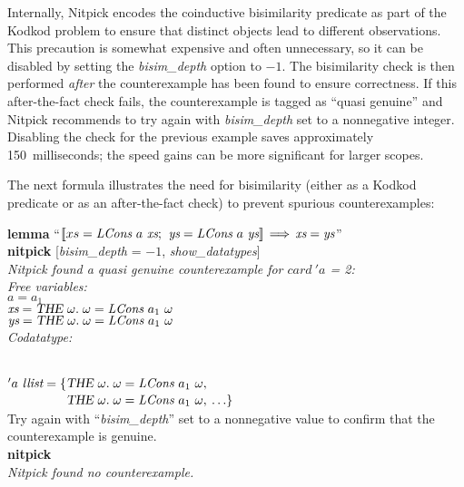 \documentclass[a4paper,12pt]{article}
\def\unr{\ldots}
\begin{document}
Internally, Nitpick encodes the coinductive bisimilarity predicate as part of
the Kodkod problem to ensure that distinct objects lead to different
observations. This precaution is somewhat expensive and often unnecessary, so it
can be disabled by setting the \textit{bisim\_depth} option to $-1$. The
bisimilarity check is then performed \textsl{after} the counterexample has been
found to ensure correctness. If this after-the-fact check fails, the
counterexample is tagged as ``quasi genuine'' and Nitpick recommends to try
again with \textit{bisim\_depth} set to a nonnegative integer. Disabling the
check for the previous example saves approximately 150~milli\-seconds; the speed
gains can be more significant for larger scopes.

The next formula illustrates the need for bisimilarity (either as a Kodkod
predicate or as an after-the-fact check) to prevent spurious counterexamples:

\prew
\textbf{lemma} ``$\mathopen{[\![} xs = \textit{LCons}~a~\textit{xs};\>\, \textit{ys} = \textit{LCons}~a~\textit{ys}\mathclose{]\!]}
\,\Longrightarrow\, \textit{xs} = \textit{ys}$'' \\
\textbf{nitpick} [\textit{bisim\_depth} = $-1$, \textit{show\_datatypes}] \\[2\smallskipamount]
\slshape Nitpick found a quasi genuine counterexample for $\textit{card}~'a$ = 2: \\[2\smallskipamount]
\hbox{}\qquad Free variables: \nopagebreak \\
\hbox{}\qquad\qquad $a = a_1$ \\
\hbox{}\qquad\qquad $\textit{xs} = \textsl{THE}~\omega.\; \omega =
\textit{LCons}~a_1~\omega$ \\
\hbox{}\qquad\qquad $\textit{ys} = \textsl{THE}~\omega.\; \omega = \textit{LCons}~a_1~\omega$ \\
\hbox{}\qquad Codatatype:\strut \nopagebreak \\
\hbox{}\qquad\qquad $'a~\textit{llist} =
\{\!\begin{aligned}[t]
  & \textsl{THE}~\omega.\; \omega = \textit{LCons}~a_1~\omega, \\[-2pt]
  & \textsl{THE}~\omega.\; \omega = \textit{LCons}~a_1~\omega,\> \unr\}\end{aligned}$
\\[2\smallskipamount]
Try again with ``\textit{bisim\_depth}'' set to a nonnegative value to confirm
that the counterexample is genuine. \\[2\smallskipamount]
{\upshape\textbf{nitpick}} \\[2\smallskipamount]
\slshape Nitpick found no counterexample.
\postw
\end{document}
